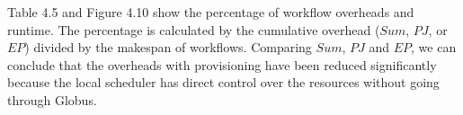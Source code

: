 Table 4.5 and Figure 4.10 show the percentage of workflow overheads and runtime. The percentage is calculated by the cumulative overhead ($Sum$, $PJ$, or $EP$) divided by the makespan of workflows. Comparing $Sum$, $PJ$ and $EP$, we can conclude that the overheads with provisioning have been reduced significantly because the local scheduler has direct control over the resources without going through Globus. 


